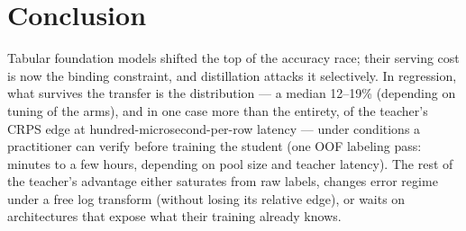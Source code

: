 \documentclass[11pt]{article}
\begin{document}
\section{Conclusion}

Tabular foundation models shifted the top of the accuracy race;
their serving cost is now
the binding constraint, and distillation attacks it selectively. In
regression, what survives the transfer is the distribution --- a median
12--19\% (depending on tuning of the arms), and in one case more than
the entirety, of the teacher's CRPS edge
at hundred-microsecond-per-row latency --- under conditions a
practitioner can verify before training the student (one OOF
labeling pass: minutes to a few hours, depending on pool size and
teacher latency). The rest
of the teacher's advantage either saturates from raw labels, changes
error regime under a free log transform (without losing its relative
edge), or waits on architectures that expose what their
training already knows.



\end{document}
